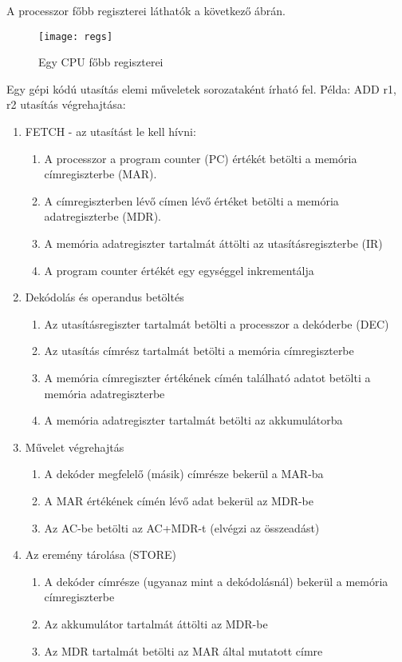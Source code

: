 A processzor főbb regiszterei láthatók a következő ábrán.
\begin{figure}[H]
    \texttt{[image: regs]}
    \centering
    \caption{Egy CPU főbb regiszterei}
    \label{fig:regs}
\end{figure}

Egy gépi kódú utasítás elemi műveletek sorozataként írható fel.
Példa: ADD r1, r2 utasítás végrehajtása:
\begin{enumerate}
    \item FETCH - az utasítást le kell hívni:
    \begin{enumerate}
        \item A processzor a program counter (PC) értékét betölti a memória címregiszterbe (MAR).
        \item A címregiszterben lévő címen lévő értéket betölti a memória adatregiszterbe (MDR).
        \item A memória adatregiszter tartalmát áttölti az utasításregiszterbe (IR)
        \item A program counter értékét egy egységgel inkrementálja
    \end{enumerate}
    \item Dekódolás és operandus betöltés
    \begin{enumerate}
        \item Az utasításregiszter tartalmát betölti a processzor a dekóderbe (DEC)
        \item Az utasítás címrész tartalmát betölti a memória címregiszterbe
        \item A memória címregiszter értékének címén található adatot betölti a memória adatregiszterbe
        \item A memória adatregiszter tartalmát betölti az akkumulátorba
    \end{enumerate}
    \item Művelet végrehajtás
    \begin{enumerate}
        \item A dekóder megfelelő (másik) címrésze bekerül a MAR-ba
        \item A MAR értékének címén lévő adat bekerül az MDR-be
        \item Az AC-be betölti az AC+MDR-t (elvégzi az összeadást)
    \end{enumerate}
    \item Az eremény tárolása (STORE)
    \begin{enumerate}
        \item A dekóder címrésze (ugyanaz mint a dekódolásnál) bekerül a memória címregiszterbe
        \item Az akkumulátor tartalmát áttölti az MDR-be
        \item Az MDR tartalmát betölti az MAR által mutatott címre
    \end{enumerate}
\end{enumerate}

